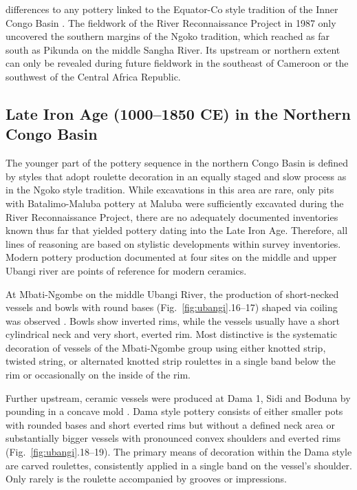 \documentclass[smallextended,natbib]{svjour3}       %
\begin{document}
differences to any pottery linked to the Equator-Co style tradition of the Inner Congo Basin \citep{Wotzka.1995}. The fieldwork of the River Reconnaissance Project in 1987 only uncovered the southern margins of the Ngoko tradition, which reached as far south as Pikunda on the middle Sangha River. Its upstream or northern extent can only be revealed during future fieldwork in the southeast of Cameroon or the southwest of the Central Africa Republic.

\subsection*{Late Iron Age (1000--1850 CE) in the Northern Congo Basin}

The younger part of the pottery sequence in the northern Congo Basin is defined by styles that adopt roulette decoration in an equally staged and slow process as in the Ngoko style tradition. While excavations in this area are rare, only pits with Batalimo-Maluba pottery at Maluba were sufficiently excavated during the River Reconnaissance Project, there are no adequately documented inventories known thus far that yielded pottery dating into the Late Iron Age. Therefore, all lines of reasoning are based on stylistic developments within survey inventories. Modern pottery production documented at four sites on the middle and upper Ubangi river are points of reference for modern ceramics.

At Mbati-Ngombe on the middle Ubangi River, the production of short-necked vessels and bowls with round bases (Fig.~\ref{fig:ubangi}.16--17) shaped via coiling was observed \citep[109-121]{Seidensticker.2021e}. Bowls show inverted rims, while the vessels usually have a short cylindrical neck and very short, everted rim. Most distinctive is the systematic decoration of vessels of the Mbati-Ngombe group using either knotted strip, twisted string, or alternated knotted strip roulettes \citep[88--105]{LivingstoneSmith.2010b} in a single band below the rim or occasionally on the inside of the rim.

Further upstream, ceramic vessels were produced at Dama 1, Sidi and Boduna by pounding in a concave mold \citep[69 Ftn.~101]{Seidensticker.2021e}. Dama style pottery \citep[104--109]{Seidensticker.2021e} consists of either smaller pots with rounded bases and short everted rims but without a defined neck area or substantially bigger vessels with pronounced convex shoulders and everted rims (Fig.~\ref{fig:ubangi}.18--19). The primary means of decoration within the Dama style are carved roulettes, consistently applied in a single band on the vessel’s shoulder. Only rarely is the roulette accompanied by grooves or impressions.
\end{document}
